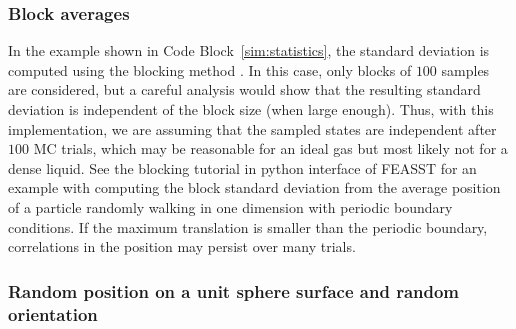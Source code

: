 \subsubsection{\label{sec:block_av}Block averages}

In the example shown in Code Block~\ref{sim:statistics}, the standard deviation is computed using the blocking method \cite{flyvbjerg_error_1989}.
In this case, only blocks of $100$ samples are considered, but a careful analysis would show that the resulting standard deviation is independent of the block size (when large enough).
Thus, with this implementation, we are assuming that the sampled states are independent after $100$ MC trials, which may be reasonable for an ideal gas but most likely not for a dense liquid.
See the blocking tutorial in python interface of FEASST \cite{hatch_monte_2024} for an example with computing the block standard deviation from the average position of a particle randomly walking in one dimension with periodic boundary conditions.
If the maximum translation is smaller than the periodic boundary, correlations in the position may persist over many trials.

\begin{figure}

\end{figure}

\subsubsection{\label{sec:unit_sphere}Random position on a unit sphere surface and random orientation}


